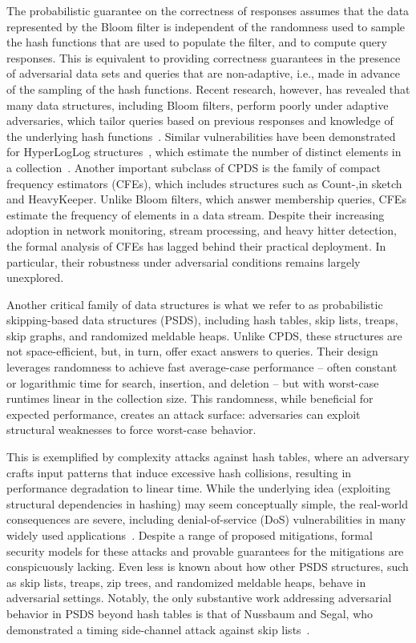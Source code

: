 The probabilistic guarantee on the correctness of responses assumes that the data represented by the Bloom filter is independent of the randomness used to sample the hash functions that are used to populate the filter, and to compute query responses.  This is equivalent to providing correctness guarantees in the presence of adversarial data sets and queries that are non-adaptive, i.e., made in advance of the sampling of the hash functions.  Recent research, however, has revealed that many data structures, including Bloom filters, perform poorly under adaptive adversaries, which tailor queries based on previous responses and knowledge of the underlying hash functions~\cite{naor2015bloom,clayton2019,CCS:FPUV22,filic2025deletions}. Similar vulnerabilities have been demonstrated for HyperLogLog structures~\cite{PatersonR22}, which estimate the number of distinct elements in a collection~\cite{flajolet2007hyperloglog}. Another important subclass of CPDS is the family of compact frequency estimators (CFEs), which includes structures such as Count-,in sketch and HeavyKeeper. Unlike Bloom filters, which answer membership queries, CFEs estimate the frequency of elements in a data stream. Despite their increasing adoption in network monitoring, stream processing, and heavy hitter detection, the formal analysis of CFEs has lagged behind their practical deployment. In particular, their robustness under adversarial conditions remains largely unexplored.

Another critical family of data structures is what we refer to as probabilistic skipping-based data structures (PSDS), including  hash tables, skip lists, treaps, skip graphs, and randomized meldable heaps. Unlike CPDS, these structures are not space-efficient, but, in turn, offer exact answers to queries. Their design leverages randomness to achieve fast average-case performance -- often constant or logarithmic time for search, insertion, and deletion -- but with worst-case runtimes linear in the collection size. This randomness, while beneficial for expected performance, creates an attack surface: adversaries can exploit structural weaknesses to force worst-case behavior.

This is exemplified by complexity attacks against hash tables, where an adversary crafts input patterns that induce excessive hash collisions, resulting in performance degradation to linear time. While the underlying idea (exploiting structural dependencies in hashing) may seem conceptually simple, the real-world consequences are severe, including denial-of-service (DoS) vulnerabilities in many widely used applications~\cite{CrosbyW03,klink2011efficient,aumasson2012hash,rosen2014netfilter,bottinelli2025hash}. Despite a range of proposed mitigations, formal security models for these attacks and provable guarantees for the mitigations are conspicuously lacking. Even less is known about how other PSDS structures, such as skip lists, treaps, zip trees, and randomized meldable heaps, behave in adversarial settings. Notably, the only substantive work addressing adversarial behavior in PSDS beyond hash tables is that of Nussbaum and Segal, who demonstrated a timing side-channel attack against skip lists~\cite{nussbaum2019skiplist}.

